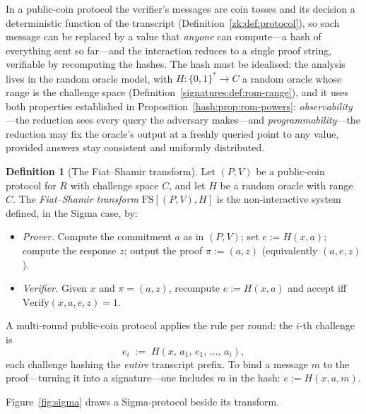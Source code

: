 \documentclass[11pt,a4paper]{article}
\theoremstyle{definition}
\newtheorem{definition}[theorem]{Definition}
\theoremstyle{remark}
\begin{document}
In a public-coin protocol the verifier's messages are coin tosses and
its decision a deterministic function of the transcript
(Definition~\ref{zk:def:protocol}), so each message can be replaced by
a value that \emph{anyone} can compute---a hash of everything sent so
far---and the interaction reduces to a single proof string, verifiable
by recomputing the hashes. The hash must be idealised: the analysis
lives in the random oracle model, with \(H \colon \{0,1\}^{*} \to C\) a
random oracle whose range is the challenge space
(Definition~\ref{signatures:def:rom-range}), and it uses both
properties established in Proposition~\ref{hash:prop:rom-powers}:
\emph{observability}---the reduction sees every query the adversary
makes---and \emph{programmability}---the reduction may fix the
oracle's output at a freshly queried point to any value, provided
answers stay consistent and uniformly distributed.

\begin{definition}[The Fiat--Shamir transform]\label{zk:def:fs}
Let \((P, V)\) be a public-coin protocol for \(R\) with challenge
space \(C\), and let \(H\) be a random oracle with range \(C\). The
\emph{Fiat--Shamir transform} \(\mathrm{FS}[(P, V), H]\) is the
non-interactive system defined, in the Sigma case, by:
\begin{itemize}
\item \emph{Prover.} Compute the commitment \(a\) as in \((P, V)\);
  set \(e := H(x, a)\); compute the response \(z\); output the proof
  \(\pi := (a, z)\) (equivalently \((a, e, z)\)).
\item \emph{Verifier.} Given \(x\) and \(\pi = (a, z)\), recompute
  \(e := H(x, a)\) and accept iff
  \(\mathrm{Verify}(x, a, e, z) = 1\).
\end{itemize}
A multi-round public-coin protocol applies the rule per round: the
\(i\)-th challenge is
\[
e_i \;:=\; H(x,\, a_1,\, e_1,\, \dots,\, a_i),
\]
each challenge hashing the \emph{entire} transcript prefix. To bind
a message \(m\) to the proof---turning it into a signature---one
includes \(m\) in the hash: \(e := H(x, a, m)\).
\end{definition}

Figure~\ref{fig:sigma} draws a Sigma-protocol beside its transform.
\end{document}
